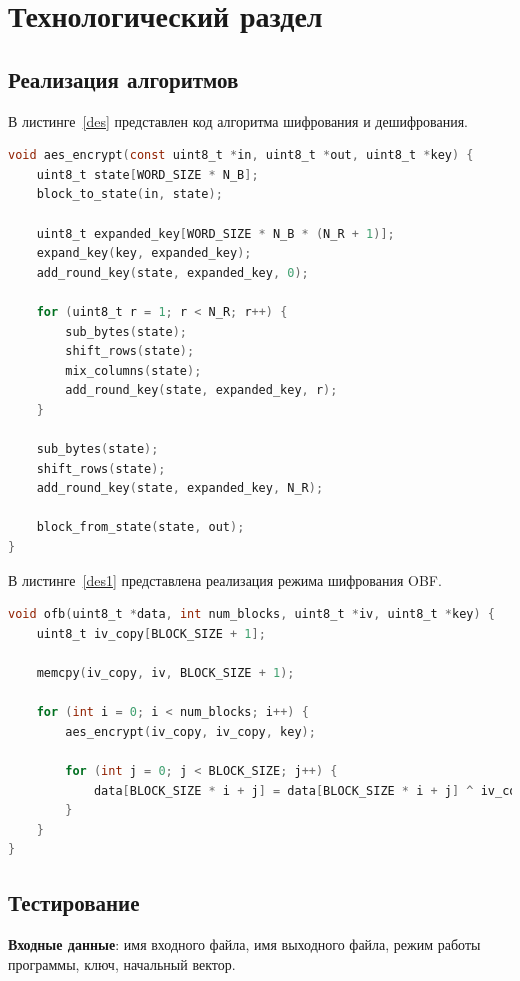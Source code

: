 \section{Технологический раздел}

\subsection{Реализация алгоритмов}

В листинге~\ref{des} представлен код алгоритма шифрования и дешифрования.

\begin{lstlisting}[label=des,caption=Исходный код шифрования, language=C]
void aes_encrypt(const uint8_t *in, uint8_t *out, uint8_t *key) {
    uint8_t state[WORD_SIZE * N_B];
    block_to_state(in, state);

    uint8_t expanded_key[WORD_SIZE * N_B * (N_R + 1)];
    expand_key(key, expanded_key);
    add_round_key(state, expanded_key, 0);

    for (uint8_t r = 1; r < N_R; r++) {
        sub_bytes(state);
        shift_rows(state);
        mix_columns(state);
        add_round_key(state, expanded_key, r);
    }

    sub_bytes(state);
    shift_rows(state);
    add_round_key(state, expanded_key, N_R);

    block_from_state(state, out);
}
\end{lstlisting}

\newpage
В листинге~\ref{des1} представлена реализация режима шифрования OBF.

\begin{lstlisting}[language=C, caption=Реализация режима шифрования OBF, label=des1]
void ofb(uint8_t *data, int num_blocks, uint8_t *iv, uint8_t *key) {
    uint8_t iv_copy[BLOCK_SIZE + 1];

    memcpy(iv_copy, iv, BLOCK_SIZE + 1);

    for (int i = 0; i < num_blocks; i++) {
        aes_encrypt(iv_copy, iv_copy, key);

        for (int j = 0; j < BLOCK_SIZE; j++) {
            data[BLOCK_SIZE * i + j] = data[BLOCK_SIZE * i + j] ^ iv_copy[j];
        }
    }
}
\end{lstlisting}	


\subsection{Тестирование}
\textbf{Входные данные}: имя входного файла, имя выходного файла, режим работы программы, ключ, начальный вектор.

